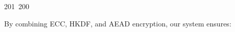 201~200~\documentclass{article}
\begin{document}
	                                                                                                                                                                                                                                                                                                	                                                                                                                                        	    	                                                                                                	                                                                                                                                                                                                                                                                                                                                	                                                                        	                                                                        	                                                                                                                                        	                                                                                                                                                                                                                        	                                                    By combining ECC, HKDF, and AEAD encryption, our system ensures:
\end{document}
